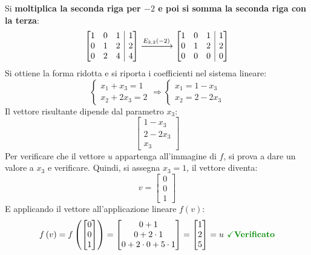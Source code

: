 \documentclass[a4paper]{article}
\makeatletter
\newenvironment{rowequmatbra}[1]{\left[\array{@{}#1@{}}}{\endarray\right]}
\makeatother
\begin{document}
	Si \textbf{moltiplica la seconda riga per $-2$ e poi si somma la seconda riga con la terza}:
	\begin{equation*}
		\begin{rowequmatbra}{ccc|c}
			1 & 0 & 1 & 1 \\
			0 & 1 & 2 & 2 \\
			0 & 2 & 4 & 4
		\end{rowequmatbra}
		\xlongrightarrow{E_{3,2}\left(-2\right)}
		\begin{rowequmatbra}{ccc|c}
			1 & 0 & 1 & 1 \\
			0 & 1 & 2 & 2 \\
			0 & 0 & 0 & 0
		\end{rowequmatbra}
	\end{equation*}
	Si ottiene la forma ridotta e si riporta i coefficienti nel sistema lineare:
	\begin{equation*}
		\begin{cases}
			x_{1} + x_{3} = 1 \\
			x_{2} + 2x_{3} = 2
		\end{cases} \Longrightarrow \begin{cases}
			x_{1} = 1 - x_{3} \\
			x_{2} = 2 - 2x_{3}
		\end{cases}
	\end{equation*}
	Il vettore risultante dipende dal parametro $x_{3}$:
	\begin{equation*}
		\begin{bmatrix}
			1-x_{3} \\
			2-2x_{3} \\
			x_{3}
		\end{bmatrix}
	\end{equation*}
	Per verificare che il vettore $u$ appartenga all'immagine di $f$, si prova a dare un valore a $x_{3}$ e verificare. Quindi, si assegna $x_{3} = 1$, il vettore diventa:
	\begin{equation*}
		v = \begin{bmatrix}
			0 \\
			0 \\
			1
		\end{bmatrix}
	\end{equation*}
	E applicando il vettore all'applicazione lineare $f\left(v\right)$:
	\begin{equation*}
		f\left(v\right) = f\left(\begin{bmatrix}
			0 \\
			0 \\
			1
		\end{bmatrix}\right) = \begin{bmatrix}
			0 + 1 \\
			0 + 2 \cdot 1 \\
			0 + 2 \cdot 0 + 5 \cdot 1
		\end{bmatrix} = \begin{bmatrix}
			1 \\
			2 \\
			5
		\end{bmatrix} = u \textcolor{Green4}{\textbf{ \checkmark Verificato}}
	\end{equation*}
\end{document}
